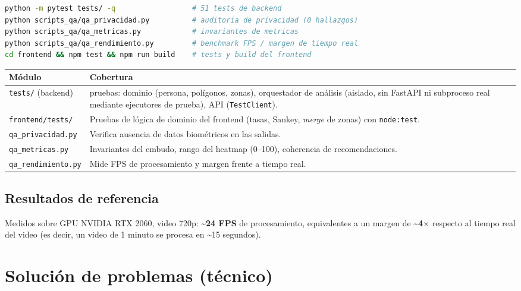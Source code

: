 \documentclass[11pt,a4paper]{report}
\begin{document}
\begin{lstlisting}[language=bash]
python -m pytest tests/ -q                  # 51 tests de backend
python scripts_qa/qa_privacidad.py          # auditoria de privacidad (0 hallazgos)
python scripts_qa/qa_metricas.py            # invariantes de metricas
python scripts_qa/qa_rendimiento.py         # benchmark FPS / margen de tiempo real
cd frontend && npm test && npm run build    # tests y build del frontend
\end{lstlisting}

\begin{longtable}{>{\raggedright\arraybackslash}p{5.2cm} >{\raggedright\arraybackslash}p{8.4cm}}
\toprule
\rowcolor{rvCodeBg}\textbf{Módulo} & \textbf{Cobertura} \\
\midrule
\endhead
\texttt{tests/} (backend) & 51 pruebas: dominio (persona, polígonos, zonas), orquestador de
análisis (aislado, sin FastAPI ni subproceso real mediante ejecutores de prueba), API
(\texttt{TestClient}). \\
\texttt{frontend/tests/} & Pruebas de lógica de dominio del frontend (tasas, Sankey,
\textit{merge} de zonas) con \texttt{node:test}. \\
\texttt{qa\_privacidad.py} & Verifica ausencia de datos biométricos en las salidas. \\
\texttt{qa\_metricas.py} & Invariantes del embudo, rango del heatmap (0--100), coherencia de
recomendaciones. \\
\texttt{qa\_rendimiento.py} & Mide FPS de procesamiento y margen frente a tiempo real. \\
\bottomrule
\end{longtable}

\section{Resultados de referencia}

Medidos sobre GPU NVIDIA RTX 2060, video 720p: \textbf{\textasciitilde 24 FPS} de procesamiento,
equivalentes a un margen de \textbf{\textasciitilde 4$\times$} respecto al tiempo real del video
(es decir, un video de 1 minuto se procesa en \textasciitilde 15 segundos).

\chapter{Solución de problemas (técnico)}
\end{document}
